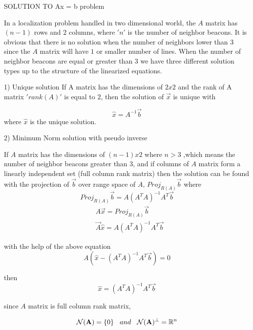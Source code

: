 \documentclass[twoside]{article}
\begin{document}
SOLUTION TO Ax = b problem

In a localization problem handled in two dimensional world, the $A$ matrix has $(n-1)$ rows and $2$ columns, where $'n'$ is the number of neighbor beacons. It is obvious that there is no solution when the number of neighbors lower than $3$ since the $A$ matrix will have $1$ or smaller number of lines. When the number of neighbor beacons are equal or greater than $3$
we have three different solution types up to the structure of the linearized equations. 

1) Unique solution
If A matrix has the dimensions of $2x2$ and the rank of A matrix $'rank(A)'$ is equal to $2$, then the solution of $\vec{x}$ is unique with

\begin{equation}
  \hat{x} = A^{-1}\vec{b}
\end{equation}
  where $\hat{x}$ is the unique solution. 
  
  
  2) Minimum Norm solution with pseudo inverse
  
  If $A$ matrix has the dimensions of $(n-1)x2$ where $n>3$ ,which means the number of neighbor beacons greater than $3$, and if columns of $A$ matrix form a linearly independent set (full column rank matrix) then the solution can be found with the projection of $\vec{b}$ over range space of $A$, $Proj_{R(A)}\vec{b}$ where
  \begin{equation}
  Proj_{R(A)}\vec{b} = A (A^TA)^{-1}A^T\vec{b}
  \end{equation}
  \begin{align*}
  & A\vec{x} = Proj_{R(A)}\vec{b}\\
  & \vec{A}\hat{x} = A(A^TA)^{-1}A^T\vec{b}
  \end{align*}
 
with the help of the above equation
\begin{equation}
  A(\hat{x} - (A^TA)^{-1}A^T\vec{b}) = 0
\end{equation}

then 
\begin{equation}
 \hat{x} = (A^TA)^{-1}A^T\vec{b}
\end{equation}
  
  since $A$ matrix is full column rank matrix,
  
  \begin{align*}
\mathcal{N}(\mathbf{A}) = \{0\} \hspace{0.3cm}  and  \hspace{0.3cm}  \mathcal{N}(\mathbf{A})^\perp =\mathbb{R} ^n 
  \end{align*}
  
\end{document}
